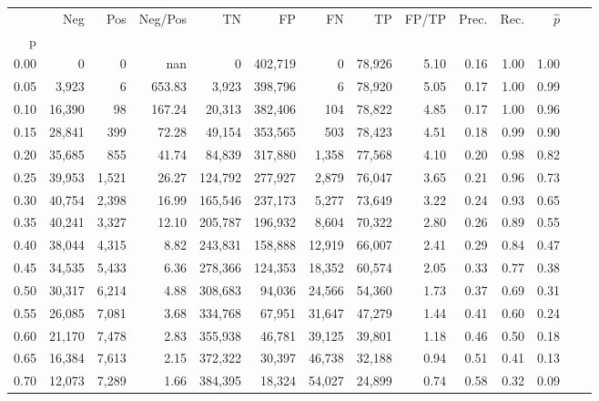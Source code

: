 \begin{tabular}{rrrrrrrrrrrrrr}
\toprule
{} &     Neg &    Pos & Neg/Pos &       TN &       FP &      FN &      TP & FP/TP & Prec. &  Rec. & $\hat{p}$ \\
p    &         &        &         &          &          &         &         &       &       &       &           \\
\midrule
0.00 &       0 &      0 &     nan &        0 &  402,719 &       0 &  78,926 &  5.10 &  0.16 &  1.00 &      1.00 \\
0.05 &   3,923 &      6 &  653.83 &    3,923 &  398,796 &       6 &  78,920 &  5.05 &  0.17 &  1.00 &      0.99 \\
0.10 &  16,390 &     98 &  167.24 &   20,313 &  382,406 &     104 &  78,822 &  4.85 &  0.17 &  1.00 &      0.96 \\
0.15 &  28,841 &    399 &   72.28 &   49,154 &  353,565 &     503 &  78,423 &  4.51 &  0.18 &  0.99 &      0.90 \\
0.20 &  35,685 &    855 &   41.74 &   84,839 &  317,880 &   1,358 &  77,568 &  4.10 &  0.20 &  0.98 &      0.82 \\
0.25 &  39,953 &  1,521 &   26.27 &  124,792 &  277,927 &   2,879 &  76,047 &  3.65 &  0.21 &  0.96 &      0.73 \\
0.30 &  40,754 &  2,398 &   16.99 &  165,546 &  237,173 &   5,277 &  73,649 &  3.22 &  0.24 &  0.93 &      0.65 \\
0.35 &  40,241 &  3,327 &   12.10 &  205,787 &  196,932 &   8,604 &  70,322 &  2.80 &  0.26 &  0.89 &      0.55 \\
0.40 &  38,044 &  4,315 &    8.82 &  243,831 &  158,888 &  12,919 &  66,007 &  2.41 &  0.29 &  0.84 &      0.47 \\
0.45 &  34,535 &  5,433 &    6.36 &  278,366 &  124,353 &  18,352 &  60,574 &  2.05 &  0.33 &  0.77 &      0.38 \\
0.50 &  30,317 &  6,214 &    4.88 &  308,683 &   94,036 &  24,566 &  54,360 &  1.73 &  0.37 &  0.69 &      0.31 \\
0.55 &  26,085 &  7,081 &    3.68 &  334,768 &   67,951 &  31,647 &  47,279 &  1.44 &  0.41 &  0.60 &      0.24 \\
0.60 &  21,170 &  7,478 &    2.83 &  355,938 &   46,781 &  39,125 &  39,801 &  1.18 &  0.46 &  0.50 &      0.18 \\
0.65 &  16,384 &  7,613 &    2.15 &  372,322 &   30,397 &  46,738 &  32,188 &  0.94 &  0.51 &  0.41 &      0.13 \\
0.70 &  12,073 &  7,289 &    1.66 &  384,395 &   18,324 &  54,027 &  24,899 &  0.74 &  0.58 &  0.32 &      0.09 \\

\end{tabular}
